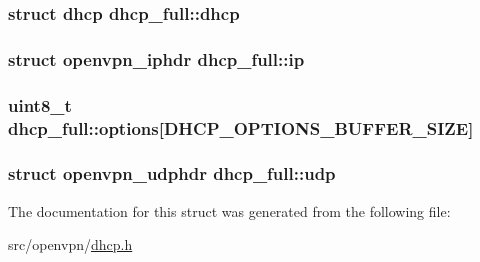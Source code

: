 \subsubsection[{dhcp}]{\setlength{\rightskip}{0pt plus 5cm}struct {\bf dhcp} dhcp\+\_\+full\+::dhcp}\label{structdhcp__full_a09fb9e25414b72a8c98b066658ce5620}
\hypertarget{structdhcp__full_ae7929b1f4d783e190e16ab02496627dc}{}
\subsubsection[{ip}]{\setlength{\rightskip}{0pt plus 5cm}struct {\bf openvpn\+\_\+iphdr} dhcp\+\_\+full\+::ip}\label{structdhcp__full_ae7929b1f4d783e190e16ab02496627dc}
\hypertarget{structdhcp__full_a38a739413e13f836ec73fd62f15a8ccf}{}
\subsubsection[{options}]{\setlength{\rightskip}{0pt plus 5cm}uint8\+\_\+t dhcp\+\_\+full\+::options\mbox{[}{\bf D\+H\+C\+P\+\_\+\+O\+P\+T\+I\+O\+N\+S\+\_\+\+B\+U\+F\+F\+E\+R\+\_\+\+S\+I\+Z\+E}\mbox{]}}\label{structdhcp__full_a38a739413e13f836ec73fd62f15a8ccf}
\hypertarget{structdhcp__full_a04131a0760b62cb22902d629ce3af538}{}
\subsubsection[{udp}]{\setlength{\rightskip}{0pt plus 5cm}struct {\bf openvpn\+\_\+udphdr} dhcp\+\_\+full\+::udp}\label{structdhcp__full_a04131a0760b62cb22902d629ce3af538}


The documentation for this struct was generated from the following file\+:\begin{DoxyCompactItemize}
\item 
src/openvpn/\hyperlink{dhcp_8h}{dhcp.\+h}\end{DoxyCompactItemize}

